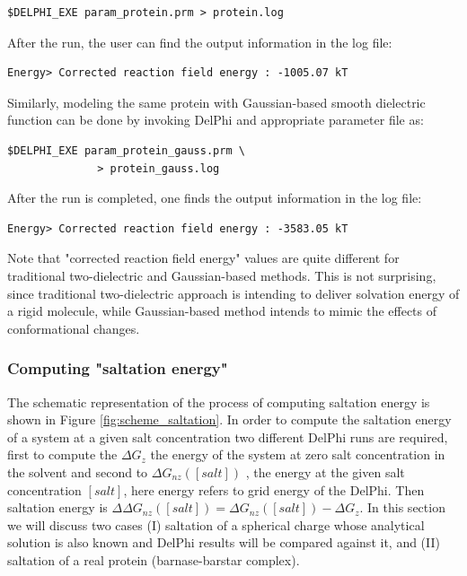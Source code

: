 \documentclass[9pt,tutorial]{livecoms}
\begin{document}
\begin{verbatim}
$DELPHI_EXE param_protein.prm > protein.log
\end{verbatim}

After the run, the user can find the output information in the log file: 

\begin{verbatim}
Energy> Corrected reaction field energy : -1005.07 kT
\end{verbatim}

Similarly, modeling the same protein with Gaussian-based smooth dielectric function can be done by invoking DelPhi and appropriate parameter file as:

\begin{verbatim}
$DELPHI_EXE param_protein_gauss.prm \
              > protein_gauss.log
\end{verbatim}

After the run is completed, one finds the output information in the log file: 

\begin{verbatim}
Energy> Corrected reaction field energy : -3583.05 kT
\end{verbatim}

Note that "corrected reaction field energy" values are quite different for traditional two-dielectric and Gaussian-based methods. This is not surprising, since traditional two-dielectric approach is intending to deliver solvation energy of a rigid molecule, while Gaussian-based method intends to mimic the effects of conformational changes.

\subsubsection{Computing "saltation energy"}

The schematic representation of the process of computing saltation energy is shown in Figure \ref{fig:scheme_saltation}. In order to compute the saltation energy of a system at a given salt concentration two different DelPhi runs are required, first to compute the $ \Delta G_{z} $ the energy of the system at zero salt concentration in the solvent and second to $ \Delta G_{nz}([salt]) $ , the energy at the given salt concentration $[salt]$, here energy refers to grid energy of the DelPhi. Then saltation energy is $ \Delta\Delta G_{nz}([salt]) = \Delta G_{nz}([salt]) - \Delta G_{z}$. In this section we will discuss two cases (I) saltation of a spherical charge whose analytical solution is also known and DelPhi results will be compared against it, and (II) saltation of a real protein (barnase-barstar complex).
\newline
\newline
\end{document}
